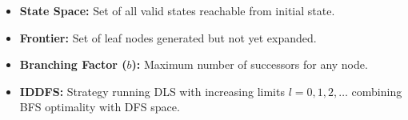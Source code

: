 \documentclass[12pt,a4paper]{article}
\begin{document}
\begin{tcolorbox}[defbox, title={\textbf{One-Line Definitions}}]
  \begin{itemize}[leftmargin=*, noitemsep]
    \item \textbf{State Space:} Set of all valid states reachable from initial state.
    \item \textbf{Frontier:} Set of leaf nodes generated but not yet expanded.
    \item \textbf{Branching Factor ($b$):} Maximum number of successors for any node.
    \item \textbf{IDDFS:} Strategy running DLS with increasing limits $l=0,1,2,\dots$ combining BFS optimality with DFS space.
  \end{itemize}
\end{tcolorbox}
\end{document}
